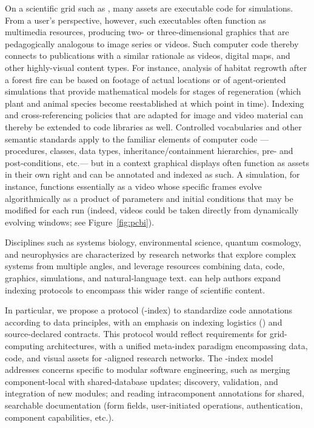 \documentclass[11pt]{article}
\begin{document}
{{\begin{description}
\pseudoIndent{}  On a scientific grid such as 
\CaBIG{}, many assets are executable code 
for  simulations.  
From a user's perspective, however, such 
executables often function as multimedia 
resources, producing two- or three-dimensional 
graphics that are pedagogically analogous 
to image series or videos.  Such computer code 
thereby connects to publications with a 
similar rationale as videos, digital maps, and 
other highly-visual content types.  For instance, 
analysis of habitat regrowth after a forest 
fire can be based on footage of actual locations 
or of agent-oriented simulations that provide 
mathematical models for stages of regeneration 
(which plant and animal species become reestablished 
at which point in time).  Indexing and cross-referencing 
policies that are adapted for image and video material 
can thereby be extended to code libraries as 
well.  Controlled vocabularies and other semantic 
standards apply to the familiar elements 
of computer code --- procedures, classes, data types, 
inheritance/containment hierarchies, pre- and post-conditions, 
etc.\@ --- but in a  context graphical displays 
often function as assets in their own right and can 
be annotated and indexed as such.  A \ThreeD{} simulation, 
for instance, functions essentially as a video whose 
specific frames evolve algorithmically as a product 
of parameters and initial conditions that may 
be modified for each run (indeed, videos could be 
taken directly from dynamically evolving \GUI{} windows; 
see Figure~\ref{fig:pcbi}).
  
\pseudoIndent{}  Disciplines such as systems biology, 
environmental science, quantum cosmology, and neurophysics 
are characterized by research networks that explore complex 
systems from multiple angles, and leverage resources 
combining data, code, graphics, simulations, and natural-language 
text.  \lPacTk{} can help authors expand indexing protocols 
to encompass this wider range of scientific content.  

\pseudoIndent{}  In particular, we propose a    
protocol (\Scign{}-index) to standardize \Cpp{} 
code annotations according to \FAIR{}data principles, 
with an emphasis on indexing \GUI{} logistics () 
and source-declared contracts.  This protocol 
would reflect requirements for grid-computing 
architectures, with a unified meta-index 
paradigm encompassing data, code, and 
visual assets for \FAIR{}-aligned research networks.
The \Scign{}-index model addresses 
concerns specific to modular software engineering, 
such as merging component-local with shared-database updates; 
discovery, validation, and integration of new modules; 
and reading intracomponent 
annotations for shared, searchable 
documentation (form fields, user-initiated 
operations, authentication, component capabilities, etc.). 
\enlargethispage{25pt}


\end{description}}}
\end{document}
